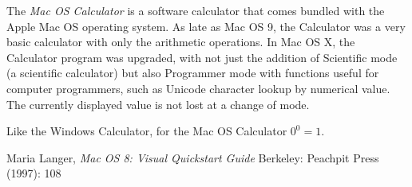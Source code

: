 \documentclass[12pt]{article}
\begin{document}
The {\em Mac OS Calculator} is a software calculator that comes bundled with the Apple Mac OS operating system. As late as Mac OS 9, the Calculator was a very basic calculator with only the arithmetic operations. In Mac OS X, the Calculator program was upgraded, with not just the addition of Scientific mode (a scientific calculator) but also Programmer mode with functions useful for computer programmers, such as Unicode character lookup by numerical value. The currently displayed value is not lost at a change of mode.

Like the Windows Calculator, for the Mac OS Calculator $0^0 = 1$.

\begin{thebibliography}{1}
 Maria Langer, {\it Mac OS 8: Visual Quickstart Guide} Berkeley: Peachpit Press (1997): 108
\end{thebibliography}
\end{document}
